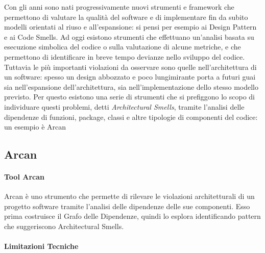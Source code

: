
Con gli anni sono nati progressivamente nuovi strumenti e framework che permettono di valutare la qualit\`a del software e di implementare fin da subito modelli orientati al riuso e all'espansione: si pensi per esempio ai Design Pattern \cite{gamma1995design} e ai Code Smells\cite{fowler1999refactoring}. Ad oggi esistono strumenti che effettuano un'analisi basata su esecuzione simbolica del codice o sulla valutazione di alcune metriche, e che permettono di identificare in breve tempo devianze nello sviluppo del codice. Tuttavia le pi\`u importanti violazioni da osservare sono quelle nell'architettura di un software: spesso un design abbozzato e poco lungimirante porta a futuri guai sia nell'espansione dell'architettura, sia nell'implementazione dello stesso modello previsto. Per questo esistono una serie di strumenti che si prefiggono lo scopo di individuare questi problemi, detti \emph{Architectural Smells}, tramite l'analisi delle dipendenze di funzioni, package, classi e altre tipologie di componenti del codice: un esempio \`e Arcan \cite{Arcan}

\subsection{Arcan}

\paragraph{Tool Arcan}

Arcan \`e uno strumento che permette di rilevare le violazioni architetturali di un progetto software tramite l'analisi delle dipendenze delle sue componenti. Esso prima costruisce il Grafo delle Dipendenze, quindi lo esplora identificando pattern che suggeriscono Architectural Smells.



\paragraph{Limitazioni Tecniche}


